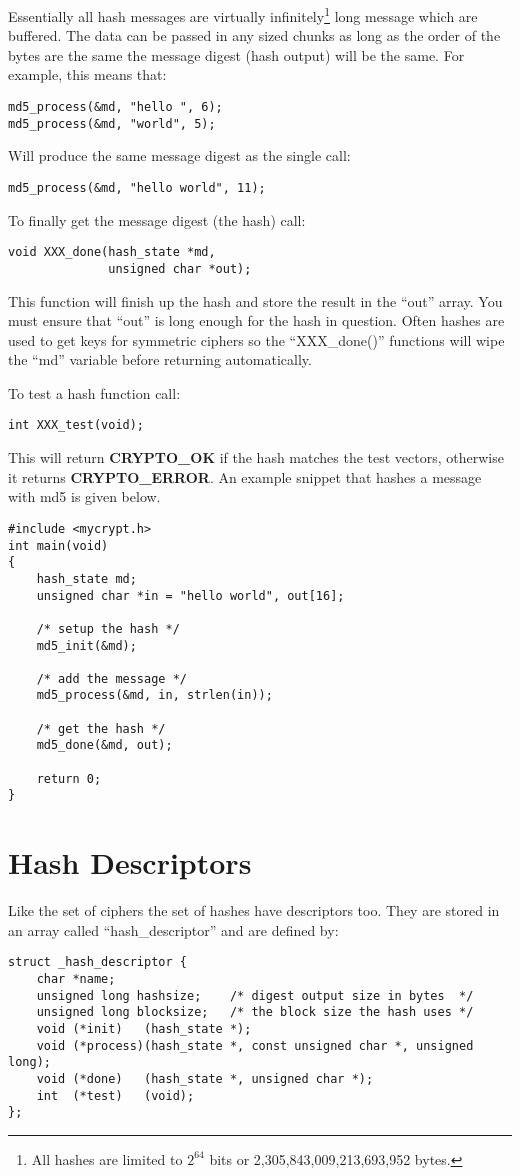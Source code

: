 \documentclass{book}
\begin{document}
Essentially all hash messages are virtually infinitely\footnote{All hashes are limited to $2^{64}$ bits or 2,305,843,009,213,693,952 bytes.} long message which 
are buffered.  The data can be passed in any sized chunks as long as the order of the bytes are the same the message digest
(hash output) will be the same.  For example, this means that:
\begin{verbatim}
md5_process(&md, "hello ", 6);
md5_process(&md, "world", 5);
\end{verbatim}
Will produce the same message digest as the single call:
\begin{verbatim}
md5_process(&md, "hello world", 11);
\end{verbatim}

To finally get the message digest (the hash) call:
\begin{verbatim}
void XXX_done(hash_state *md, 
              unsigned char *out);
\end{verbatim}

This function will finish up the hash and store the result in the ``out'' array.  You must ensure that ``out'' is long
enough for the hash in question.  Often hashes are used to get keys for symmetric ciphers so the ``XXX\_done()'' functions
will wipe the ``md'' variable before returning automatically.

To test a hash function call:
\begin{verbatim}
int XXX_test(void);
\end{verbatim}

This will return {\bf CRYPTO\_OK} if the hash matches the test vectors, otherwise it returns {\bf CRYPTO\_ERROR}.  An
example snippet that hashes a message with md5 is given below.
\begin{small}
\begin{verbatim}
#include <mycrypt.h>
int main(void)
{
    hash_state md;
    unsigned char *in = "hello world", out[16];

    /* setup the hash */
    md5_init(&md);

    /* add the message */
    md5_process(&md, in, strlen(in));

    /* get the hash */
    md5_done(&md, out);

    return 0;
}
\end{verbatim}
\end{small}

\section{Hash Descriptors}
Like the set of ciphers the set of hashes have descriptors too.  They are stored in an array called ``hash\_descriptor'' and
are defined by:
\begin{verbatim}
struct _hash_descriptor {
    char *name;
    unsigned long hashsize;    /* digest output size in bytes  */
    unsigned long blocksize;   /* the block size the hash uses */
    void (*init)   (hash_state *);
    void (*process)(hash_state *, const unsigned char *, unsigned long);
    void (*done)   (hash_state *, unsigned char *);
    int  (*test)   (void);
};
\end{verbatim}
\end{document}
